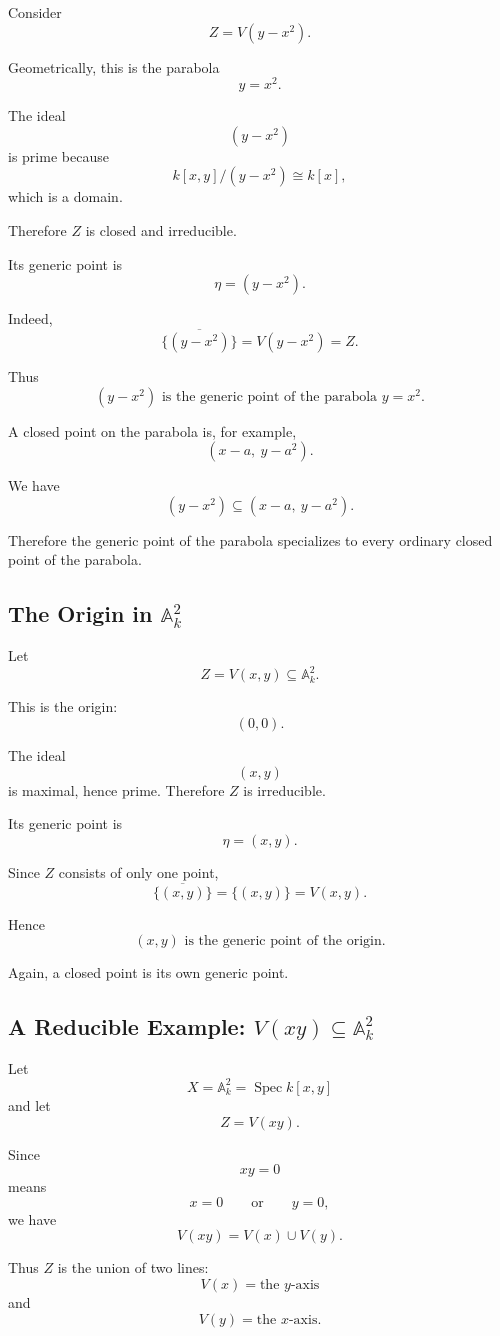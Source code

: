 \documentclass[12pt,a4paper]{article}
\theoremstyle{notespace}
\begin{document}
Consider
\[
Z=V(y-x^2).
\]

Geometrically, this is the parabola
\[
y=x^2.
\]

The ideal
\[
(y-x^2)
\]
is prime because
\[
k[x,y]/(y-x^2)\cong k[x],
\]
which is a domain.

Therefore \(Z\) is closed and irreducible.

Its generic point is
\[
\eta=(y-x^2).
\]

Indeed,
\[
\overline{\{(y-x^2)\}}=V(y-x^2)=Z.
\]

Thus
\[
\boxed{(y-x^2)\text{ is the generic point of the parabola }y=x^2.}
\]

A closed point on the parabola is, for example,
\[
(x-a,\ y-a^2).
\]

We have
\[
(y-x^2)\subseteq (x-a,\ y-a^2).
\]

Therefore the generic point of the parabola specializes to every ordinary closed point of the parabola.

\subsection{The Origin in \(\mathbb A^2_k\)}

Let
\[
Z=V(x,y)\subseteq \mathbb A^2_k.
\]

This is the origin:
\[
(0,0).
\]

The ideal
\[
(x,y)
\]
is maximal, hence prime. Therefore \(Z\) is irreducible.

Its generic point is
\[
\eta=(x,y).
\]

Since \(Z\) consists of only one point,
\[
\overline{\{(x,y)\}}=\{(x,y)\}=V(x,y).
\]

Hence
\[
\boxed{(x,y)\text{ is the generic point of the origin}.}
\]

Again, a closed point is its own generic point.

\subsection{A Reducible Example: \(V(xy)\subseteq \mathbb A^2_k\)}

Let
\[
X=\mathbb A^2_k=\operatorname{Spec} k[x,y]
\]
and let
\[
Z=V(xy).
\]

Since
\[
xy=0
\]
means
\[
x=0
\qquad\text{or}\qquad
y=0,
\]
we have
\[
V(xy)=V(x)\cup V(y).
\]

Thus \(Z\) is the union of two lines:
\[
V(x)=\text{the }y\text{-axis}
\]
and
\[
V(y)=\text{the }x\text{-axis}.
\]
\end{document}

